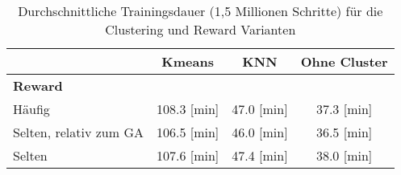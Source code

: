 \begin{table}[ht]
\caption{Durchschnittliche Trainingsdauer (1,5 Millionen Schritte) für die Clustering und Reward Varianten}
\centering
\label{tab:zeiten_training}
\begin{tabular}{lccc}
\hline
\textbf{} & \textbf{Kmeans} & \textbf{KNN} & \textbf{Ohne Cluster} \\
\hline
\multicolumn{4}{l}{\textbf{Reward}} \\
\hspace{1em}Häufig & 108.3 [min] & 47.0 [min] & 37.3 [min] \\
\hspace{1em}Selten, relativ zum GA & 106.5 [min] & 46.0 [min] & 36.5 [min] \\
\hspace{1em}Selten & 107.6 [min] & 47.4 [min] & 38.0 [min] \\
\hline
\end{tabular}
\end{table}
